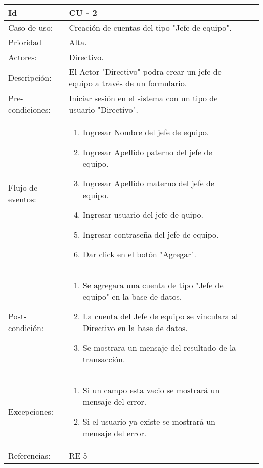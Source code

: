 \documentclass[11pt,a4paper]{article}
\begin{document}
\begin{tabular}[c]{|p{3cm}|p{13cm}|p{2.5cm}|p{3cm}|}
\hline 
\rule[-1ex]{0pt}{2.5ex} Id & CU - 2 \\ 
\hline 
\rule[-1ex]{0pt}{2.5ex} Caso de uso: & Creación de cuentas del tipo "Jefe de equipo". \\ 
\hline 
\rule[-1ex]{0pt}{2.5ex} Prioridad & Alta. \\ 
\hline 
\rule[-1ex]{0pt}{2.5ex} Actores: & Directivo. \\ 
\hline 
\rule[-1ex]{0pt}{2.5ex} Descripción: & El Actor "Directivo" podra crear un jefe de equipo a través de un formulario. \\ 
\hline 
\rule[-1ex]{0pt}{2.5ex} Pre-condiciones: & Iniciar sesión en el sistema con un tipo de usuario "Directivo". \\ 
\hline 
\rule[-1ex]{0pt}{2.5ex} Flujo de eventos: & \begin{enumerate}
\item Ingresar Nombre del jefe de equipo.
\item Ingresar Apellido paterno del jefe de equipo.
\item Ingresar Apellido materno del jefe de equipo.
\item Ingresar usuario del jefe de quipo.
\item Ingresar contraseña del jefe de equipo.
\item Dar click en el botón "Agregar".
\end{enumerate} \\ 
\hline 
\rule[-1ex]{0pt}{2.5ex} Post-condición: & \begin{enumerate}
\item Se agregara una cuenta de tipo "Jefe de equipo" en la base de datos.
\item La cuenta del Jefe de equipo se vinculara al Directivo en la base de datos.
\item Se mostrara un mensaje del resultado de la transacción.
\end{enumerate} \\ 
\hline 
\rule[-1ex]{0pt}{2.5ex} Excepciones: & \begin{enumerate}
\item Si un campo esta vacio se mostrará un mensaje del error.
\item Si el usuario ya existe se mostrará un mensaje del error.
\end{enumerate} \\ 
\hline 
\rule[-1ex]{0pt}{2.5ex} Referencias: & RE-5\\ 
\hline 
\end{tabular} 
\\
\end{document}
